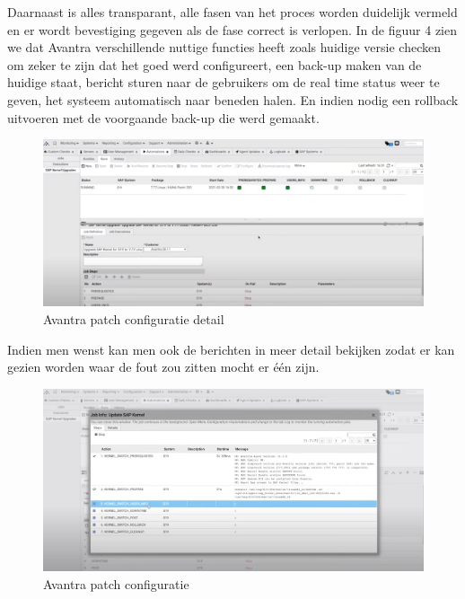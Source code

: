 \documentclass[dutch,dit,thesis]{hogentreport}
\begin{document}
Daarnaast is alles transparant, alle fasen van het proces worden duidelijk vermeld en er wordt bevestiging gegeven als de fase correct is verlopen. In de figuur 4 zien we dat Avantra verschillende
nuttige functies heeft zoals huidige versie checken om zeker te zijn dat het goed werd configureert, een back-up maken van de huidige staat, bericht sturen naar de gebruikers om de real time status weer
   te geven, het systeem automatisch naar beneden halen. En indien nodig een rollback uitvoeren met de voorgaande back-up die werd gemaakt.

\begin{figure}[htbp]
    \centering
    \includegraphics[width=\textwidth]{avantra2.png}
    \caption{Avantra patch configuratie detail}
     \label{fig:avantra2}
\end{figure}

Indien men wenst kan men ook de berichten in meer detail bekijken zodat er kan gezien worden waar de fout zou zitten mocht er één zijn.

\begin{figure}[htbp]
    \centering
    \includegraphics[width=\textwidth]{avantra3.png}
    \caption{Avantra patch configuratie}
     \label{fig:avantra3}
\end{figure}
\end{document}
